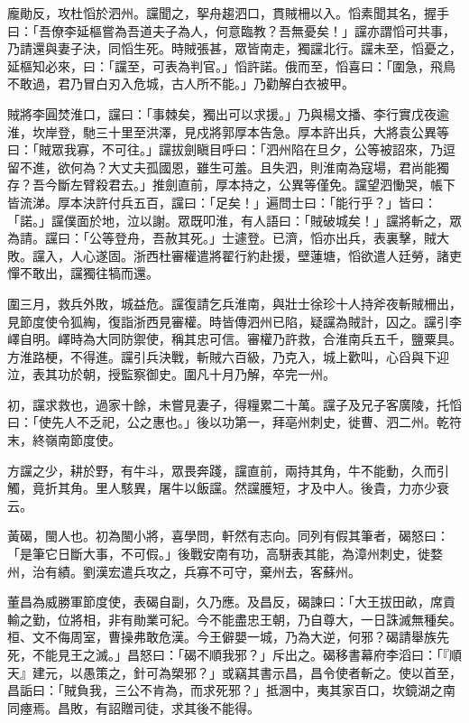 \begin{pinyinscope}
 龐勛反，攻杜慆於泗州。讜聞之，挐舟趨泗口，貫賊柵以入。慆素聞其名，握手曰：「吾僚李延樞嘗為吾道夫子為人，何意臨教？吾無憂矣！」讜亦謂慆可共事，乃請還與妻子決，同慆生死。時賊張甚，眾皆南走，獨讜北行。讜未至，慆憂之，延樞知必來，曰：「讜至，可表為判官。」慆許諾。俄而至，慆喜曰：「圍急，飛鳥不敢過，君乃冒白刃入危城，古人所不能。」乃勸解白衣被甲。



 賊將李圓焚淮口，讜曰：「事棘矣，獨出可以求援。」乃與楊文播、李行實戊夜逾淮，坎岸登，馳三十里至洪澤，見戍將郭厚本告急。厚本許出兵，大將袁公異等曰：「賊眾我寡，不可往。」讜拔劍瞋目呼曰：「泗州陷在旦夕，公等被詔來，乃逗留不進，欲何為？大丈夫孤國恩，雖生可羞。且失泗，則淮南為寇場，君尚能獨存？吾今斷左臂殺君去。」推劍直前，厚本持之，公異等僅免。讜望泗慟哭，帳下皆流涕。厚本決許付兵五百，讜曰：「足矣！」遍問士曰：「能行乎？」皆曰：「諾。」讜僕面於地，泣以謝。眾既叩淮，有人語曰：「賊破城矣！」讜將斬之，眾為請。讜曰：「公等登舟，吾赦其死。」士遽登。已濟，慆亦出兵，表裏擊，賊大敗。讜入，人心遂固。浙西杜審權遣將翟行約赴援，壁蓮塘，慆欲遣人廷勞，諸吏憚不敢出，讜獨往犒而還。



 圍三月，救兵外敗，城益危。讜復請乞兵淮南，與壯士徐珍十人持斧夜斬賊柵出，見節度使令狐綯，復詣浙西見審權。時皆傳泗州已陷，疑讜為賊計，囚之。讜引李嶧自明。嶧時為大同防禦使，稱其忠可信。審權乃許救，合淮南兵五千，鹽粟具。方淮路梗，不得進。讜引兵決戰，斬賊六百級，乃克入，城上歡叫，心舀與下迎泣，表其功於朝，授監察御史。圍凡十月乃解，卒完一州。



 初，讜求救也，過家十餘，未嘗見妻子，得糧累二十萬。讜子及兄子客廣陵，托慆曰：「使先人不乏祀，公之惠也。」後以功第一，拜亳州刺史，徙曹、泗二州。乾符末，終嶺南節度使。



 方讜之少，耕於野，有牛斗，眾畏奔踐，讜直前，兩持其角，牛不能動，久而引觸，竟折其角。里人駭異，屠牛以飯讜。然讜臒短，才及中人。後貴，力亦少衰云。



 黃碣，閩人也。初為閩小將，喜學問，軒然有志向。同列有假其筆者，碣怒曰：「是筆它日斷大事，不可假。」後戰安南有功，高駢表其能，為漳州刺史，徙婺州，治有績。劉漢宏遣兵攻之，兵寡不可守，棄州去，客蘇州。



 董昌為威勝軍節度使，表碣自副，久乃應。及昌反，碣諫曰：「大王拔田畝，席貢輸之勤，位將相，非有勛業可紀。今不能盡忠王朝，乃自尊大，一日誅滅無種矣。桓、文不侮周室，曹操弗敢危漢。今王僻嬰一城，乃為大逆，何邪？碣請舉族先死，不能見王之滅。」昌怒曰：「碣不順我邪？」斥出之。碣移書幕府李滔曰：「『順天』建元，以愚策之，針可為槊邪？」或竊其書示昌，昌令使者斬之。使以首至，昌詬曰：「賊負我，三公不肯為，而求死邪？」抵溷中，夷其家百口，坎鏡湖之南同瘞焉。昌敗，有詔贈司徒，求其後不能得。




\end{pinyinscope}
